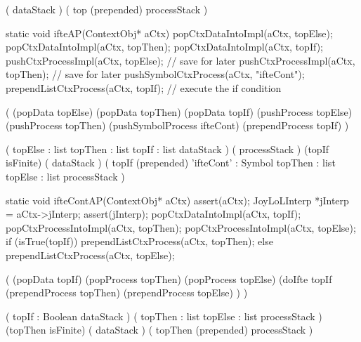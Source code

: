 \postDataStack
  (
    dataStack
  )
\postProcessStack
  (
    top (prepended)
    processStack
  )
\postConditions
\stopPostStack

\stopWord

\stoptyping

\startJoyLoLWord[ifte]

\startCCode
static void ifteAP(ContextObj* aCtx) {
  popCtxDataIntoImpl(aCtx, topElse);
  popCtxDataIntoImpl(aCtx, topThen);
  popCtxDataIntoImpl(aCtx, topIf);
  pushCtxProcessImpl(aCtx, topElse); // save for later
  pushCtxProcessImpl(aCtx, topThen); // save for later
  pushSymbolCtxProcess(aCtx, "ifteCont");
  prependListCtxProcess(aCtx, topIf); // execute the if condition
}
\stopCCode

\startImplementation[ansic]
  (
    (popData topElse)
    (popData topThen)
    (popData topIf)
    (pushProcess topElse)
    (pushProcess topThen)
    (pushSymbolProcess ifteCont)
    (prependProcess topIf)
  )
\stopImplementation

\startRule[ifte]
\preDataStack
  (
    topElse : list
    topThen : list
    topIf   : list
    dataStack
  )
\preProcessStack
  (
    processStack
  )
\preConditions
  (topIf isFinite)
\postDataStack
  (
    dataStack
  )
\postProcessStack
  (
    topIf (prepended)
    'ifteCont' : Symbol
    topThen    : list
    topElse    : list
    processStack
  )
\postConditions
\stopRule

\stopJoyLoLWord

\startJoyLoLWord[ifteCont]

\startCCode
static void ifteContAP(ContextObj* aCtx) {
  assert(aCtx);
  JoyLoLInterp *jInterp = aCtx->jInterp;
  assert(jInterp);
  popCtxDataIntoImpl(aCtx, topIf);
  popCtxProcessIntoImpl(aCtx, topThen);
  popCtxProcessIntoImpl(aCtx, topElse);
  if (isTrue(topIf)) {
    prependListCtxProcess(aCtx, topThen);
  } else {
    prependListCtxProcess(aCtx, topElse);
  }
}
\stopCCode

\startImplementation[ansic]
  (
    (popData topIf)
    (popProcess topThen)
    (popProcess topElse)
    (doIfte topIf 
      (prependProcess topThen)
      (prependProcess topElse)
    )
  )
\stopImplementation

\preDataStack
  (
    topIf : Boolean
    dataStack
  )
\preProcessStack
  (
    topThen : list
    topElse : list
    processStack
  )
\preConditions
  (topThen isFinite)
\postDataStack
  (
    dataStack
  )
\postProcessStack
  (
    topThen (prepended)
    processStack
  )
\postConditions
\stopRule

